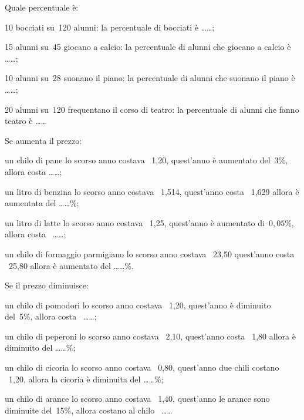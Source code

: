 \begin{esercizio}
 \label{ese:3.91}
Quale percentuale è:
\begin{enumeratea}
 \item 10 bocciati su~120 alunni: la percentuale di bocciati è \ldots\ldots;
 \item 15 alunni su~45 giocano a calcio: la percentuale di alunni che giocano 
 a calcio è \ldots\ldots;
 \item 10 alunni su~28 suonano il piano: la percentuale di alunni che suonano 
 il piano è \ldots\ldots;
 \item 20 alunni su~120 frequentano il corso di teatro: la percentuale di 
 alunni che fanno teatro è \ldots\ldots
\end{enumeratea}
\end{esercizio}

\begin{esercizio}
 \label{ese:3.92}
Se aumenta il prezzo:
\begin{enumeratea}
 \item un chilo di pane lo scorso anno costava \officialeuro\ 1,20, quest'anno 
 è aumentato del~$3\%$, allora costa
\ldots\ldots;
 \item un litro di benzina lo scorso anno costava \officialeuro\ 1,514, 
 quest'anno costa \officialeuro\ 1,629
 allora è aumentata del \ldots\ldots\%;
 \item un litro di latte lo scorso anno costava \officialeuro\ 1,25, 
 quest'anno è aumentato di~$0,05\%$,
allora costa \officialeuro\ \ldots\ldots;
 \item un chilo di formaggio parmigiano lo scorso anno costava 
 \officialeuro\ 23,50 quest'anno costa \officialeuro\ 25,80
allora è aumentato del \ldots\ldots\%.
\end{enumeratea}
\end{esercizio}

\begin{esercizio}
 \label{ese:3.93}
Se il prezzo diminuisce:
\begin{enumeratea}
 \item un chilo di pomodori lo scorso anno costava \officialeuro\ 1,20, 
 quest'anno è diminuito del~5\%,
allora costa \officialeuro\ \ldots\ldots;
 \item un chilo di peperoni lo scorso anno costava \officialeuro\ 2,10, 
 quest'anno costa \officialeuro\ 1,80 allora
è diminuito del \ldots\ldots\%;
 \item un chilo di cicoria lo scorso anno costava \officialeuro\ 0,80, 
 quest'anno due chili costano \officialeuro\ 1,20,
allora la cicoria è diminuita del \ldots\ldots\%;
 \item un chilo di arance lo scorso anno costava \officialeuro\ 1,40, 
 quest'anno le arance sono diminuite del~15\%,
allora costano al chilo \officialeuro\ \ldots\ldots
\end{enumeratea}
\end{esercizio}


